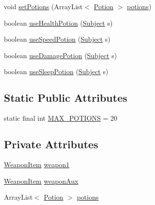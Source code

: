 \begin{DoxyCompactItemize}
\item 
void \mbox{\hyperlink{classitems_1_1_inventary_a9d214c7fe7f1c10fc4d036676f1860a4}{set\+Potions}} (Array\+List$<$ \mbox{\hyperlink{classitems_1_1_potion}{Potion}} $>$ \mbox{\hyperlink{classitems_1_1_inventary_afa542455e08a2cc05377133889b7b091}{potions}})
\item 
boolean \mbox{\hyperlink{classitems_1_1_inventary_a16f2878bacc73497112aaadb1befef1c}{use\+Health\+Potion}} (\mbox{\hyperlink{classentities_1_1_subject}{Subject}} s)
\item 
boolean \mbox{\hyperlink{classitems_1_1_inventary_ac1eb691e8eacc5e30ae323ed5517af89}{use\+Speed\+Potion}} (\mbox{\hyperlink{classentities_1_1_subject}{Subject}} s)
\item 
boolean \mbox{\hyperlink{classitems_1_1_inventary_a648ae01539c92790718993880a097e55}{use\+Damage\+Potion}} (\mbox{\hyperlink{classentities_1_1_subject}{Subject}} s)
\item 
boolean \mbox{\hyperlink{classitems_1_1_inventary_a0465268c54df439b77684c86a07d3049}{use\+Sleep\+Potion}} (\mbox{\hyperlink{classentities_1_1_subject}{Subject}} s)
\end{DoxyCompactItemize}
\subsection*{Static Public Attributes}
\begin{DoxyCompactItemize}
\item 
static final int \mbox{\hyperlink{classitems_1_1_inventary_abaf12a4cf7de3bd0ca1131e43800e2bb}{M\+A\+X\+\_\+\+P\+O\+T\+I\+O\+NS}} = 20
\end{DoxyCompactItemize}
\subsection*{Private Attributes}
\begin{DoxyCompactItemize}
\item 
\mbox{\hyperlink{classitems_1_1_weapon_item}{Weapon\+Item}} \mbox{\hyperlink{classitems_1_1_inventary_ad16ddfb714d749294e1fe64841ca9074}{weapon1}}
\item 
\mbox{\hyperlink{classitems_1_1_weapon_item}{Weapon\+Item}} \mbox{\hyperlink{classitems_1_1_inventary_a1f8cf512e097112b449136da9c6670b7}{weapon\+Aux}}
\item 
Array\+List$<$ \mbox{\hyperlink{classitems_1_1_potion}{Potion}} $>$ \mbox{\hyperlink{classitems_1_1_inventary_afa542455e08a2cc05377133889b7b091}{potions}}
\end{DoxyCompactItemize}


